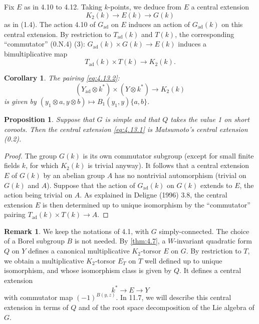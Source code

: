 \documentclass[11pt,a4paper]{article}
\theoremstyle{plain}
\newtheorem{proposition}[theorem]{Proposition}
\newtheorem{corollary}[theorem]{Corollary}
\theoremstyle{definition}
\newtheorem{remark}[theorem]{Remark}
\newcommand{\ad}{\mathrm{ad}}
\begin{document}
\subsection{}
Fix $E$ as in 4.10 to 4.12. Taking $k$-points, we deduce from $E$ a central extension
\begin{equation}\label{eq:4.13.1}
K_2(k) \to E(k) \to G(k)
\end{equation}
as in (1.4). The action 4.10 of $G_\ad$ on $E$ induces an action of $G_\ad(k)$ on this central extension. By restriction to $T_\ad(k)$ and $T(k)$, the corresponding ``commutator'' (0.N.4) (3): $G_\ad(k) \times G(k) \to E(k)$ induces a bimultiplicative map
\begin{equation}\label{eq:4.13.2}
T_\ad(k) \times T(k) \to K_2(k).
\end{equation}

\begin{corollary}\label{cor:4.14}
The pairing \eqref{eq:4.13.2}:
\[(Y_\ad \otimes k^*) \times (Y \otimes k^*) \to K_2(k)\]
is given by $(y_1 \otimes a, y \otimes b) \mapsto B_1(y_1, y) \{a, b\}$.
\end{corollary}

\begin{proposition}\label{prop:4.15}
Suppose that $G$ is simple and that $Q$ takes the value 1 on short coroots. Then the central extension \eqref{eq:4.13.1} is Matsumoto's central extension \textup{(0.2)}.
\end{proposition}

\begin{proof}
The group $G(k)$ is its own commutator subgroup (except for small finite fields $k$, for which $K_2(k)$ is trivial anyway). It follows that a central extension $E$ of $G(k)$ by an abelian group $A$ has no nontrivial automorphism (trivial on $G(k)$ and $A$). Suppose that the action of $G_\ad(k)$ on $G(k)$ extends to $E$, the action being trivial on $A$. As explained in Deligne (1996) 3.8, the central extension $E$ is then determined up to unique isomorphism by the ``commutator'' pairing $T_\ad(k) \times T(k) \to A$.
\end{proof}

\begin{remark}
We keep the notations of 4.1, with $G$ simply-connected. The choice of a Borel subgroup $B$ is not needed. By \ref{thm:4.7}, a $W$-invariant quadratic form $Q$ on $Y$ defines a canonical multiplicative $K_2$-torsor $E$ on $G$. By restriction to $T$, we obtain a multiplicative $K_2$-torsor $E_T$ on $T$ well defined up to unique isomorphism, and whose isomorphism class is given by $Q$. It defines a central extension
\[k^* \to E \to Y\]
with commutator map $(-1)^{B(y,z)}$. In 11.7, we will describe this central extension in terms of $Q$ and of the root space decomposition of the Lie algebra of $G$.
\end{remark}
\end{document}
